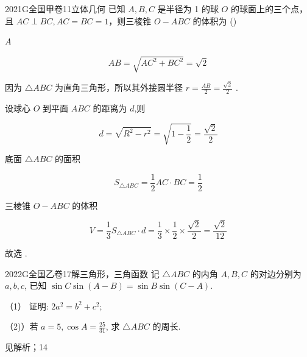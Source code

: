 \documentclass[12pt,UTF-8,a4paper]{ctexart}
\numberwithin{figure}{section}
\theoremstyle{mystyle}
\theoremstyle{mystylekaishu}
\theoremstyle{mystyle}
\numberwithin{xiti}{section}
\begin{document}

\begin{problem}{2021}{G}{全国甲卷}{11}{立体几何}
已知 $A, B, C$ 是半径为 1 的球 $O$ 的球面上的三个点，且 $AC \perp BC, AC=BC=1$，则三棱锥 $O-ABC$ 的体积为 (\hspace{1cm})
\begin{choices}
\end{choices}
\end{problem}

\begin{answer}
$A$
\end{answer}

\begin{solutions}
$$
AB = \sqrt{AC^2 + BC^2} = \sqrt{2}
$$

因为 $\triangle ABC$ 为直角三角形，所以其外接圆半径 $r = \frac{AB}{2} = \frac{\sqrt{2}}{2}$ .

设球心 $O$ 到平面 $ABC$ 的距离为 $d$,则

$$
d = \sqrt{R^2 - r^2} = \sqrt{1 - \frac{1}{2}} = \frac{\sqrt{2}}{2}
$$

底面 $\triangle ABC$ 的面积

$$
S_{\triangle ABC} = \frac{1}{2} AC \cdot BC = \frac{1}{2}
$$

三棱锥 $O-ABC$ 的体积

$$
V = \frac{1}{3} S_{\triangle ABC} \cdot d = \frac{1}{3} \times \frac{1}{2} \times \frac{\sqrt{2}}{2} = \frac{\sqrt{2}}{12}
$$

故选  .
\end{solutions}


\begin{problem}{2022}{G}{全国乙卷}{17}{解三角形，三角函数}
记 $\triangle ABC$ 的内角 $A,B,C$ 的对边分别为 $a,b,c$, 已知 $\sin C\sin(A-B)=\sin B\sin(C-A)$.

（1） 证明: $2a^2=b^2+c^2$;

（2)）若 $a=5, \cos A=\frac{25}{31}$, 求 $\triangle ABC$ 的周长.
\end{problem}

\begin{answer}
见解析；14
\end{answer}
\end{document}
